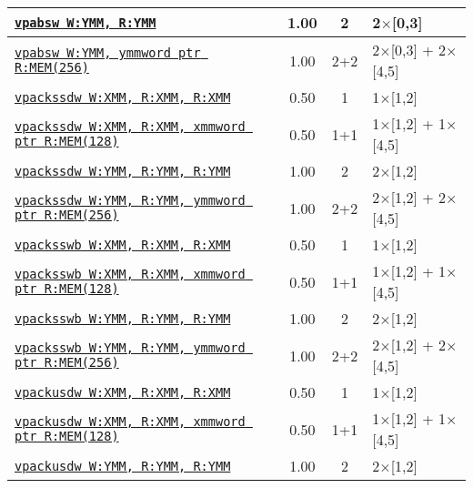 \documentclass[a4paper,english,fontsize=9]{scrartcl}
\begin{document}
\begin{longtable}{p{}ccL{.25\textwidth}}
  \midrule
  \texttt{\href{https://felixcloutier.com/x86/PABSB:PABSW:PABSD:PABSQ.html}{vpabsw W:YMM, R:YMM}} & 1.00 & 2 & 2\(\times\)[0,3] \\
  \midrule
  \texttt{\href{https://felixcloutier.com/x86/PABSB:PABSW:PABSD:PABSQ.html}{vpabsw W:YMM, ymmword ptr R:MEM(256)}} & 1.00 & 2+2 & 2\(\times\)[0,3] + 2\(\times\)[4,5] \\
  \midrule
  \texttt{\href{https://felixcloutier.com/x86/PACKSSWB:PACKSSDW.html}{vpackssdw W:XMM, R:XMM, R:XMM}} & 0.50 & 1 & 1\(\times\)[1,2] \\
  \midrule
  \texttt{\href{https://felixcloutier.com/x86/PACKSSWB:PACKSSDW.html}{vpackssdw W:XMM, R:XMM, xmmword ptr R:MEM(128)}} & 0.50 & 1+1 & 1\(\times\)[1,2] + 1\(\times\)[4,5] \\
  \midrule
  \texttt{\href{https://felixcloutier.com/x86/PACKSSWB:PACKSSDW.html}{vpackssdw W:YMM, R:YMM, R:YMM}} & 1.00 & 2 & 2\(\times\)[1,2] \\
  \midrule
  \texttt{\href{https://felixcloutier.com/x86/PACKSSWB:PACKSSDW.html}{vpackssdw W:YMM, R:YMM, ymmword ptr R:MEM(256)}} & 1.00 & 2+2 & 2\(\times\)[1,2] + 2\(\times\)[4,5] \\
  \midrule
  \texttt{\href{https://felixcloutier.com/x86/PACKSSWB:PACKSSDW.html}{vpacksswb W:XMM, R:XMM, R:XMM}} & 0.50 & 1 & 1\(\times\)[1,2] \\
  \midrule
  \texttt{\href{https://felixcloutier.com/x86/PACKSSWB:PACKSSDW.html}{vpacksswb W:XMM, R:XMM, xmmword ptr R:MEM(128)}} & 0.50 & 1+1 & 1\(\times\)[1,2] + 1\(\times\)[4,5] \\
  \midrule
  \texttt{\href{https://felixcloutier.com/x86/PACKSSWB:PACKSSDW.html}{vpacksswb W:YMM, R:YMM, R:YMM}} & 1.00 & 2 & 2\(\times\)[1,2] \\
  \midrule
  \texttt{\href{https://felixcloutier.com/x86/PACKSSWB:PACKSSDW.html}{vpacksswb W:YMM, R:YMM, ymmword ptr R:MEM(256)}} & 1.00 & 2+2 & 2\(\times\)[1,2] + 2\(\times\)[4,5] \\
  \midrule
  \texttt{\href{https://felixcloutier.com/x86/PACKUSDW.html}{vpackusdw W:XMM, R:XMM, R:XMM}} & 0.50 & 1 & 1\(\times\)[1,2] \\
  \midrule
  \texttt{\href{https://felixcloutier.com/x86/PACKUSDW.html}{vpackusdw W:XMM, R:XMM, xmmword ptr R:MEM(128)}} & 0.50 & 1+1 & 1\(\times\)[1,2] + 1\(\times\)[4,5] \\
  \midrule
  \texttt{\href{https://felixcloutier.com/x86/PACKUSDW.html}{vpackusdw W:YMM, R:YMM, R:YMM}} & 1.00 & 2 & 2\(\times\)[1,2] \\

\end{longtable}
\end{document}
